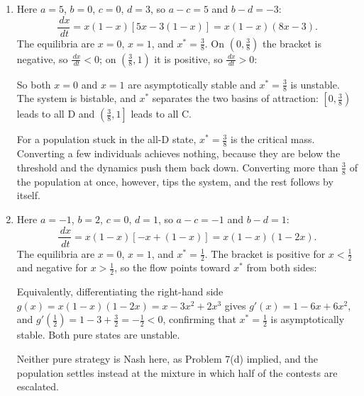 \documentclass[a4paper,12pt]{article}
\newcommand{\dd}{\,d}
\begin{document}
\begin{enumerate}[label=(\alph*)]
\item Here $a=5$, $b=0$, $c=0$, $d=3$, so $a-c=5$ and $b-d=-3$:
\[ \frac{\dd x}{\dd t} = x(1-x)\left[ 5x-3(1-x) \right] = x(1-x)(8x-3) . \]
The equilibria are $x=0$, $x=1$, and $x^*=\frac{3}{8}$. On $\left( 0,\frac{3}{8} \right)$ the bracket is negative, so $\frac{\dd x}{\dd t}<0$; on $\left( \frac{3}{8},1 \right)$ it is positive, so $\frac{\dd x}{\dd t}>0$:
\begin{center}
\end{center}
So both $x=0$ and $x=1$ are asymptotically stable and $x^*=\frac{3}{8}$ is unstable. The system is bistable, and $x^*$ separates the two basins of attraction: $\left[ 0,\frac{3}{8} \right)$ leads to all D and $\left( \frac{3}{8},1 \right]$ leads to all C.

For a population stuck in the all-D state, $x^*=\frac{3}{8}$ is the critical mass. Converting a few individuals achieves nothing, because they are below the threshold and the dynamics push them back down. Converting more than $\frac{3}{8}$ of the population at once, however, tips the system, and the rest follows by itself.

\item Here $a=-1$, $b=2$, $c=0$, $d=1$, so $a-c=-1$ and $b-d=1$:
\[ \frac{\dd x}{\dd t} = x(1-x)\left[ -x+(1-x) \right] = x(1-x)(1-2x) . \]
The equilibria are $x=0$, $x=1$, and $x^*=\frac{1}{2}$. The bracket is positive for $x<\frac{1}{2}$ and negative for $x>\frac{1}{2}$, so the flow points toward $x^*$ from both sides:
\begin{center}
\end{center}
Equivalently, differentiating the right-hand side $g(x) = x(1-x)(1-2x) = x-3x^2+2x^3$ gives $g'(x)=1-6x+6x^2$, and $g'\!\left( \frac{1}{2} \right) = 1-3+\frac{3}{2} = -\frac{1}{2}<0$, confirming that $x^*=\frac{1}{2}$ is asymptotically stable. Both pure states are unstable.

Neither pure strategy is Nash here, as Problem 7(d) implied, and the population settles instead at the mixture in which half of the contests are escalated.

\end{enumerate}
\end{document}
